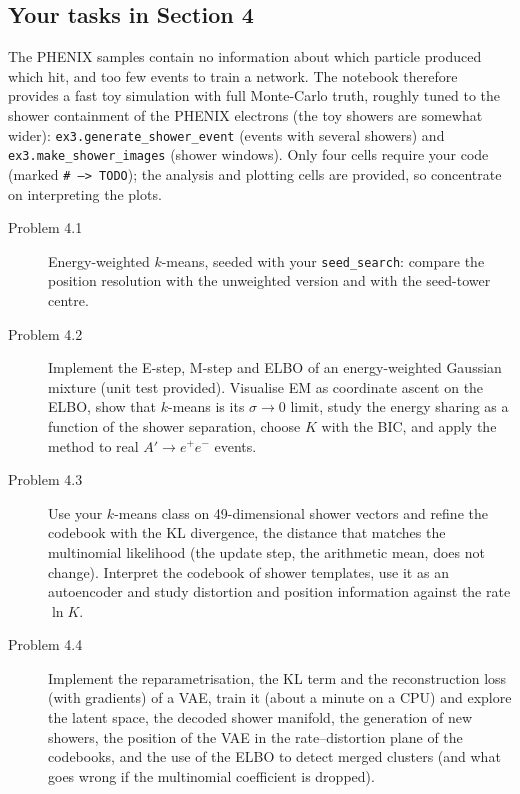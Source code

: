 \documentclass[a4paper,12pt]{article}
\begin{document}
\subsection*{Your tasks in Section 4}

The PHENIX samples contain no information about which particle produced which hit, and too few events to train a network.
The notebook therefore provides a fast toy simulation with full Monte-Carlo truth, roughly tuned to the shower containment of the PHENIX electrons (the toy showers are somewhat wider):
\texttt{ex3.generate\_shower\_event} (events with several showers) and \texttt{ex3.make\_shower\_images} (shower windows).
Only four cells require your code (marked \texttt{\# --> TODO}); the analysis and plotting cells are provided, so concentrate on interpreting the plots.
\begin{description}
\item[Problem 4.1] Energy-weighted $k$-means, seeded with your \texttt{seed\_search}: compare the position resolution with the unweighted version and with the seed-tower centre.
\item[Problem 4.2] Implement the E-step, M-step and ELBO of an energy-weighted Gaussian mixture (unit test provided).
Visualise EM as coordinate ascent on the ELBO, show that $k$-means is its $\sigma\to0$ limit, study the energy sharing as a function of the shower separation, choose $K$ with the BIC, and apply the method to real $A'\to e^+e^-$ events.
\item[Problem 4.3] Use your $k$-means class on 49-dimensional shower vectors and refine the codebook with the KL divergence, the distance that matches the multinomial likelihood (the update step, the arithmetic mean, does not change).
Interpret the codebook of shower templates, use it as an autoencoder and study distortion and position information against the rate $\ln K$.
\item[Problem 4.4] Implement the reparametrisation, the KL term and the reconstruction loss (with gradients) of a VAE, train it (about a minute on a CPU) and explore the latent space,
the decoded shower manifold, the generation of new showers, the position of the VAE in the rate--distortion plane of the codebooks,
and the use of the ELBO to detect merged clusters (and what goes wrong if the multinomial coefficient is dropped).
\end{description}
\end{document}
